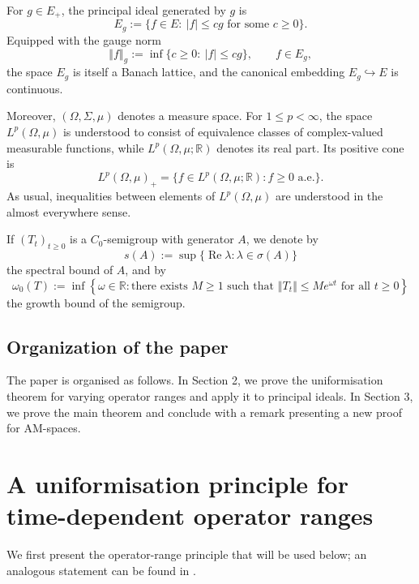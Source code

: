 \documentclass[12pt]{amsart}
\theoremstyle{plain}
\theoremstyle{definition}
\newcommand{\norm}[1]{\left\Vert #1\right\Vert}
\begin{document}
	For $g\in E_+$, the principal ideal generated by $g$ is
	\[
	E_g
	:=
	\{f\in E:\ |f|\leq c g
	\text{ for some }c\geq0\}.
	\]
	Equipped with the gauge norm
	\[
	\norm{f}_g
	:=
	\inf\{c\geq0:\ |f|\leq c g\},
	\qquad f\in E_g,
	\]
	the space $E_g$ is itself a Banach lattice, and the canonical embedding
	$E_g\hookrightarrow E$ is continuous.
	
	Moreover, $(\Omega,\Sigma,\mu)$ denotes a measure space.
	For $1\leq p<\infty$, the space $L^p(\Omega,\mu)$ is understood to consist
	of equivalence classes of complex-valued measurable functions, while $
	L^p(\Omega,\mu;\mathbb R)$ denotes its real part. Its positive cone is
	\[
	L^p(\Omega,\mu)_+
	=
	\{f\in L^p(\Omega,\mu;\mathbb R): f\geq0 \text{ a.e.}\}.
	\]
	As usual, inequalities between elements of $L^p(\Omega,\mu)$ are understood
	in the almost everywhere sense.
	
	If $(T_t)_{t\geq0}$ is a $C_0$-semigroup with generator $A$, we denote by
	\[
	s(A)
	:=
	\sup\{\operatorname{Re}\lambda:\lambda\in\sigma(A)\}
	\]
	the spectral bound of $A$, and by
	\[
	\omega_0(T)
	:=
	\inf\left\{
	\omega\in\mathbb R:
	\text{there exists }M\geq1\text{ such that }
	\norm{T_t}\leq Me^{\omega t}
	\text{ for all }t\geq0
	\right\}
	\]
	the growth bound of the semigroup.
	
	\subsection*{Organization of the paper}The paper is organised as follows. In Section 2, we prove the
	uniformisation theorem for varying operator ranges and apply it to principal
	ideals. In Section 3, we prove the main theorem and conclude with a remark presenting a new proof for AM-spaces.
	
	\section{A uniformisation principle for time-dependent operator ranges}
	
	We first present the operator-range principle that will be used below; an analogous statement can be found in \cite[Theorem 2.6]{AroraGlueck2024}.
	
\end{document}

